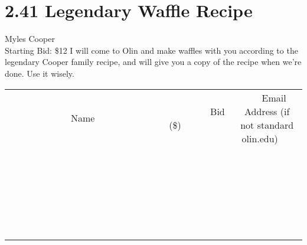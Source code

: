 \documentclass[11pt]{article}
\begin{document}
\section*{2.41 Legendary Waffle Recipe}
Myles Cooper
\\
Starting Bid: \$12
\newline
I will come to Olin and make waffles with you according to the legendary Cooper family recipe, and will give you a copy of the recipe when we're done. Use it wisely.
\\[6ex]
\begin{tabular}{c c c}
~~~~~~~~~~~~~Name~~~~~~~~~~~~~ & ~~~~~~~~~Bid (\$)~~~~~~~~~  & ~~~Email Address (if not standard olin.edu)~~~\\
 & & \\
\hline
 & & \\
\hline
 & & \\
\hline
 & & \\
\hline
 & & \\
\hline
 & & \\
\hline
 & & \\
\hline
 & & \\
\hline
 & & \\
\hline
 & & \\
\hline
 & & \\
\hline
 & & \\
\hline
 & & \\
\hline
 & & \\
\hline
 & & \\
\hline
 & & \\
\hline
 & & \\
\hline
 & & \\
\hline
 & & \\
\hline
 & & \\
\hline
 & & \\
\hline
 & & \\
\hline
 & & \\
\hline
 & & \\
\hline
 & & \\
\hline
 & & \\
\hline
\end{tabular}
\newpage
\end{document}
